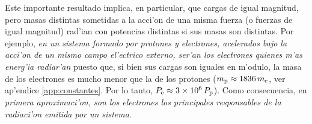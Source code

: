 Este importante resultado implica, en particular, que cargas de igual magnitud, pero masas distintas sometidas a la acci'on de una misma fuerza (o fuerzas de igual magnitud) rad'ian con potencias distintas si sus masas son distintas. Por ejemplo, \textit{en un sistema formado por protones y electrones, acelerados bajo la acci'on de un mismo campo el'ectrico externo, ser'an los electrones quienes m'as energ'ia radiar'an} puesto que, si bien sus cargas son iguales en m'odulo, la masa de los electrones es mucho menor que la de los protones ($m_{\rm p}\approx 1836\,m_{\rm e}$, ver ap'endice \ref{app:constantes}. Por lo tanto, $P_{\rm e}\approx 3\times 10^6\, P_{\rm p}$). Como consecuencia, en \textit{primera aproximaci'on, son los electrones los principales responsables de la radiaci'on emitida por un sistema}.


